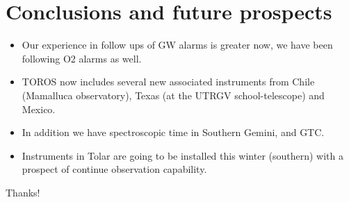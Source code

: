 \documentclass[10pt]{beamer}
\begin{document}
\section{Conclusions and future prospects}
\begin{frame}

\begin{itemize}
\item Our experience in follow ups of GW alarms is greater now, 
we have been following O2 alarms as well.

 \item TOROS now includes several new associated instruments
from Chile (Mamalluca observatory), Texas (at the UTRGV school-telescope)
and Mexico. 

\item In addition we have spectroscopic time in Southern Gemini, and
GTC. 

\item Instruments in Tolar are going to be installed this winter (southern)
with a prospect of continue observation capability.

\end{itemize}

\end{frame}
\begin{frame}
Thanks! 
\end{frame}
\end{document}
